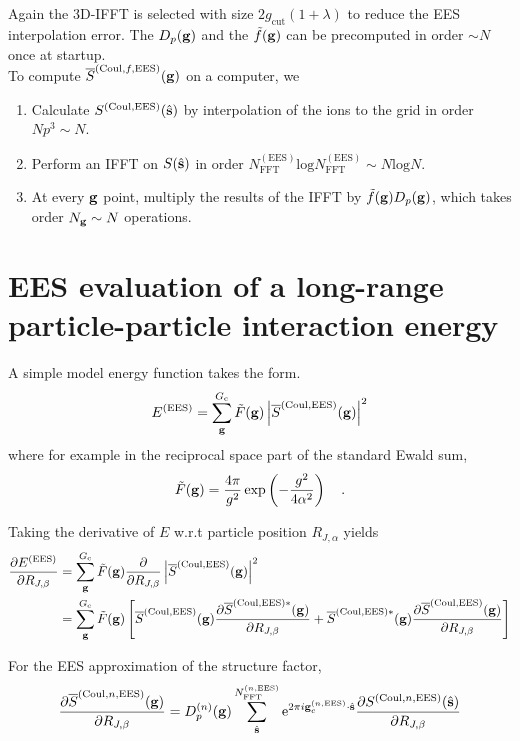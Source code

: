 \documentclass[paper=a4, fontsize=11pt]{article} %
\numberwithin{equation}{section} %
\numberwithin{figure}{section} %
\numberwithin{table}{section} %
\newcommand{\p}{\partial}
\newcommand{\ol}{\overline}
\newcommand{\bs}{{\bf{s}}}
\newcommand{\bg}{{\bf{g}}}
\newcommand{\rEES}{{\mathrm{EES}}}
\newcommand{\rcut}{{\mathrm{cut}}}
\newcommand{\re}{{\mathrm{e}}}
\newcommand{\rCo}{{\mathrm{Coul}}}
\newcommand{\rl}{{\mathrm{log}}}
\newcommand{\gcnEES}{{\bg_c^{(n,\rEES)}}}
\newcommand{\al}{{\alpha}}
\newcommand{\RJa}{{R_{J,\alpha}}}
\newcommand{\RJb}{{R_{J,\beta}}}
\newcommand{\NFFTnEES}{{N^{(n,\rEES)}_{\mathrm{FFT}}}}
\newcommand{\Gc}{{G_{\mathrm{c}}}}
\newcommand{\Dng}{{D^{(n)}_p(\bg)}}
\begin{document}
Again the 3D-IFFT is selected with size $2g_\rcut(1+\lambda)$ to reduce the EES interpolation error. The $D_p(\bg)$ and the $\tilde f(\bg)$ can be precomputed in order $\sim N$ once at startup. \\

To compute $\ol S^{(\rCo,f,\rEES)}(\bg)$ on a computer, we
\begin{enumerate}
\item Calculate $S^{(\rCo,\rEES)} (\hat \bs)$ by interpolation of the ions to the grid in order $N p^3 \sim N$.
\item Perform an IFFT on $S (\hat \bs)$ in order $N_{\mathrm{FFT}}^{(\rEES)} \rl N_{\mathrm{FFT}}^{(\rEES)} \sim N \rl N$.
\item At every $\bg$ point, multiply the results of the IFFT by $\tilde f(\bg) D_p(\bg)$, which takes order $N_{\bg} \sim N$ operations.
\end{enumerate}


\newpage
\section{EES evaluation of a long-range particle-particle interaction energy}
A simple model energy function takes the form. 
\begin{equation}
E^{(\rEES)} = \sum_\bg^\Gc \tilde F(\bg) \left| \ol S^{(\rCo,\rEES)}(\bg) \right|^2 
\end{equation}
where for example in the reciprocal space part of the standard Ewald sum, 
\begin{equation}
\tilde F(\bg) = \frac{4\pi}{g^2}\exp\left(-\frac{g^2}{4\al^2}\right)\ \ \ .
\end{equation}


Taking the derivative of $E$ w.r.t particle position $\RJa$ yields
\begin{equation}
\begin{split}
\frac{\p E^{(\rEES)}}{\p \RJb} 
&= \sum_\bg^\Gc \tilde F(\bg) \frac{\p}{\p \RJb} \left| \ol S^{(\rCo,\rEES)}(\bg) \right|^2 \\
&= \sum_\bg^\Gc \tilde F(\bg) \left[\ol S^{(\rCo,\rEES)}(\bg)\frac{\p \ol S^{(\rCo,\rEES)*}(\bg)}{\p \RJb} + \ol S^{(\rCo,\rEES)*}(\bg)\frac{\p \ol S^{(\rCo,\rEES)}(\bg)}{\p \RJb}\right] \\
\end{split}
\end{equation}

For the EES approximation of the structure factor,
\begin{equation}
\frac{\p \ol S^{(\rCo,n,\rEES)}(\bg)}{\p \RJb}=  \Dng\sum_{\hat \bs}^\NFFTnEES \re^{2\pi i\gcnEES\cdot \hat\bs} \frac{\p S^{(\rCo,n,\rEES)} (\hat \bs)}{\p \RJb}
\end{equation}
\end{document}
